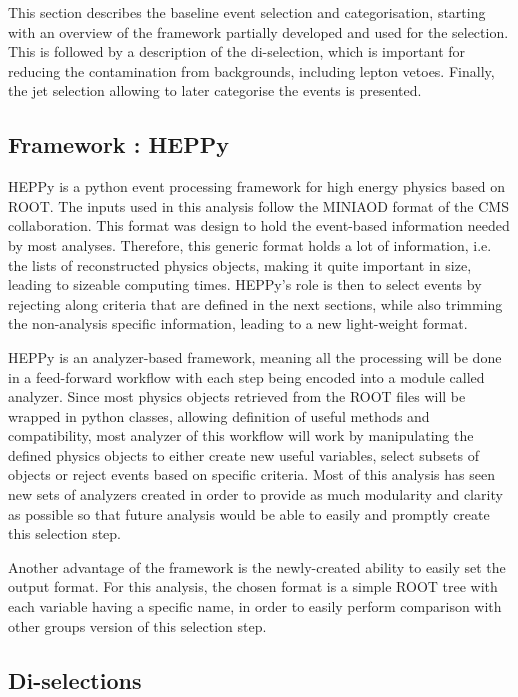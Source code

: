 This section describes the baseline event selection and categorisation, starting with an overview of the framework partially developed and used for the selection. This is followed by a description of the di-\tauh selection, which is important for reducing the contamination from backgrounds, including lepton vetoes. Finally, the jet selection allowing to later categorise the events is presented.

\subsection{Framework : HEPPy}
\label{sec:heppy}

HEPPy is a python event processing framework for high energy physics based on ROOT. The inputs used in this analysis follow the MINIAOD format of the CMS collaboration. This format was design to hold the event-based information needed by most analyses. Therefore, this generic format holds a lot of information, i.e. the lists of reconstructed physics objects, making it quite important in size, leading to sizeable computing times. HEPPy's role is then to select events by rejecting along criteria that are defined in the next sections, while also trimming the non-analysis specific information, leading to a new light-weight format.

HEPPy is an analyzer-based framework, meaning all the processing will be done in a feed-forward workflow with each step being encoded into a module called analyzer. Since most physics objects retrieved from the ROOT files will be wrapped in python classes, allowing definition of useful methods and compatibility, most analyzer of this workflow will work by manipulating the defined physics objects to either create new useful variables, select subsets of objects or reject events based on specific criteria. Most of this analysis has seen new sets of analyzers created in order to provide as much modularity and clarity as possible so that future analysis would be able to easily and promptly create this selection step.

Another advantage of the framework is the newly-created ability to easily set the output format. For this analysis, the chosen format is a simple ROOT tree with each variable having a specific name, in order to easily perform comparison with other groups version of this selection step.

\subsection{Di-\tauh selections}

